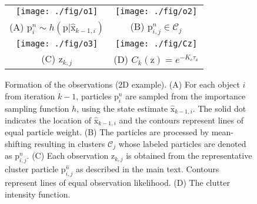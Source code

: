 \clearpage
\begin{figure}[!t]
\centering
\begin{tabular}{c@{\hspace{2em}}c}
\texttt{[image: ./fig/o1]} &
\texttt{[image: ./fig/o2]} \\[-1ex]
(A) $\mathrm{p}_{i}^{n} \sim h(\mathrm{p} | \hat{\mathrm{x}}_{k-1,i})$ &
(B) $\mathrm{p}_{i,j}^n \in \mathscr{C}_j$ \\[3ex]
\texttt{[image: ./fig/o3]} &
\texttt{[image: ./fig/Cz]} \\[-1ex]
(C) $\mathrm{z}_{k,j}$ &
(D) $C_k(\mathrm{z}) = e^{-K_c\tau_{\mathrm{z}}}$ 
\end{tabular}
\caption{Formation of the observations (2D example). (A) For each object $i$ from iteration $k-1$, particles $\mathrm{p}_{i}^{n}$ are sampled from the importance sampling function $h$, using the state estimate $\hat{\mathrm{x}}_{k-1,i}$. The solid dot indicates the location of $\hat{\mathrm{x}}_{k-1,i}$ and the contours represent lines of equal particle weight. (B) The particles are processed by mean-shifting resulting in clusters $\mathscr{C}_j$ whose labeled particles are denoted as $\mathrm{p}_{i,j}^{n}$. (C) Each observation $\mathrm{z}_{k,j}$ is obtained from the representative cluster particle $\mathrm{p}_{i,j}^{\hat{n}}$ as described in the main text. Contours represent lines of equal observation likelihood. (D) The clutter intensity function.} 
\label{fig:observation-model}
\end{figure}

